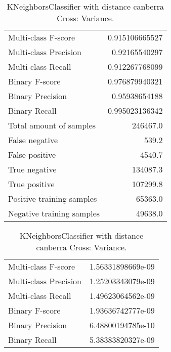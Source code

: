 \begin{table}[H]
\begin{minipage}{0.5\textwidth}
\caption{KNeighborsClassifier with distance canberra Cross: Average.}
\centering
\begin{tabular}{l r}
\toprule
Multi-class F-score & 0.915106665527 \\
Multi-class Precision & 0.92165540297 \\
Multi-class Recall & 0.912267768099 \\
\midrule
Binary F-score & 0.976879940321 \\
Binary Precision & 0.95938654188 \\
Binary Recall & 0.995023136342 \\
\midrule
Total amount of samples & 246467.0 \\
False negative & 539.2 \\
False positive & 4540.7 \\
True negative & 134087.3 \\
True positive & 107299.8 \\
\midrule
Positive training samples & 65363.0 \\
Negative training samples & 49638.0 \\
\bottomrule
\end{tabular}
\end{minipage}
\hfillx
\begin{minipage}{0.5\textwidth}
\caption{KNeighborsClassifier with distance canberra Cross: Variance.}
\centering
\begin{tabular}{l r}
\toprule
Multi-class F-score & 1.56331898669e-09 \\
Multi-class Precision & 1.25203343079e-09 \\
Multi-class Recall & 1.49623064562e-09 \\
\midrule
Binary F-score & 1.93636742777e-09 \\
Binary Precision & 6.48800194785e-10 \\
Binary Recall & 5.38383820327e-09 \\
\bottomrule
\end{tabular}
\end{minipage}
\end{table}
